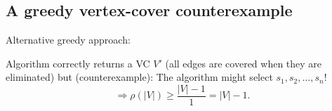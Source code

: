 \subsection{A greedy vertex-cover counterexample}
Alternative greedy approach:
\begin{notesalgorithm}
\begin{notespseudocode}
\end{notespseudocode}
\end{notesalgorithm}
Algorithm correctly returns a VC $V'$ (all edges are covered when they are eliminated) but (counterexample):
The algorithm might select $s_1,s_2,\ldots,s_n$!
\[\Rightarrow\rho(|V|)\geq\frac{|V|-1}{1}=|V|-1.\]
